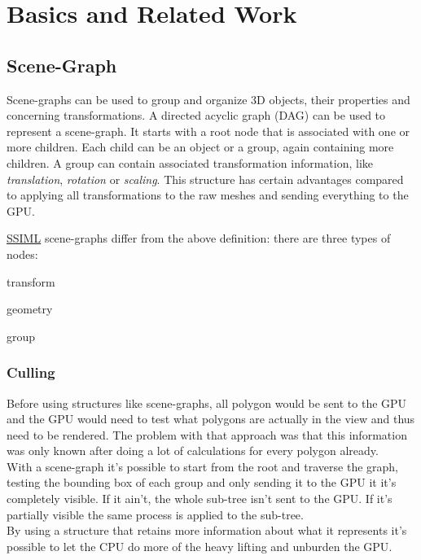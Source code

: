 
\section{Basics and Related Work}
\label{basics-and-related-work}

\subsection{Scene-Graph}\label{scene-graph}

Scene-graphs can be used to group and organize 3D objects, their
properties and concerning transformations. A directed acyclic graph
(DAG) can be used to represent a scene-graph. It starts with a root node
that is associated with one or more children. Each child can be an
object or a group, again containing more children. A group can contain
associated transformation information, like \emph{translation},
\emph{rotation} or \emph{scaling}. This structure has certain advantages
compared to applying all transformations to the raw meshes and sending
everything to the \gls{GPU}. \cite{realityprime}

\hyperref[ssiml]{SSIML} scene-graphs differ from the above definition:
there are three types of nodes:
\begin{itemize*}
  \item transform
  \item geometry
  \item group
\end{itemize*}

\subsubsection{Culling}\label{culling}

Before using structures like scene-graphs, all polygon would be sent to
the \gls{GPU} and the \gls{GPU} would need to test what polygons are actually in the
view and thus need to be rendered. The problem with that approach was
that this information was only known after doing a lot of calculations
for every polygon already.\\
With a scene-graph it's possible to start from the root and traverse the
graph, testing the bounding box of each group and only sending it to the
\gls{GPU} it it's completely visible. If it ain't, the whole sub-tree isn't
sent to the \gls{GPU}. If it's partially visible the same process is applied
to the sub-tree.\\
By using a structure that retains more information about what it
represents it's possible to let the CPU do more of the heavy
lifting and unburden the \gls{GPU}.

